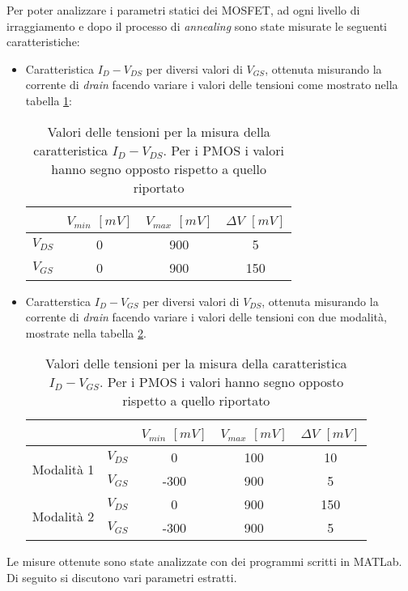 Per poter analizzare i parametri statici dei MOSFET, ad ogni livello di irraggiamento e dopo il processo di \emph{annealing} sono state misurate le seguenti caratteristiche:

\begin{itemize}

\item{Caratteristica $I_D-V_{DS}$} per diversi valori di $V_{GS}$, ottenuta misurando la corrente di \emph{drain} facendo variare i valori delle tensioni come mostrato nella tabella \ref{tab:tensioniIdVds}:

\begin{table}[ht]
  \renewcommand{\arraystretch}{1.3}
  \centering
    \begin{tabular}{c c c c}
      \toprule
         & $V_{min}$ $[mV]$ & $V_{max}$ $[mV]$ & $\Delta V$ $[mV]$ \\
     \midrule
	  $V_{DS}$ & 0 & 900 & 5 \\
	\hline
	   $V_{GS}$ & 0 & 900 & 150\\
      \bottomrule
    \end{tabular}
  \caption[Valori delle tensioni per la misura della caratteristica $I_D-V_{DS}$]{Valori delle tensioni per la misura della caratteristica $I_D-V_{DS}$. Per i PMOS i valori hanno segno opposto rispetto a quello riportato}
  \label{tab:tensioniIdVds}
\end{table}

\item{Caratterstica $I_D-V_{GS}$} per diversi valori di $V_{DS}$, ottenuta misurando la corrente di \emph{drain} facendo variare i valori delle tensioni con due modalità, mostrate nella tabella \ref{tab:tensioniIdVgs}. 

\begin{table}[ht]
  \renewcommand{\arraystretch}{1.3}
  \centering
    \begin{tabular}{c c c c c}
      \toprule
        & & $V_{min}$ $[mV]$ & $V_{max}$ $[mV]$ & $\Delta V$ $[mV]$ \\
     \midrule
	  \multirow{2}{*}{Modalità 1} & $V_{DS}$ & 0 & 100 & 10 \\
	\cmidrule{2-5}
	  & $V_{GS}$ & -300 & 900 & 5\\
	\midrule
	  \multirow{2}{*}{Modalità 2} & $V_{DS}$ & 0 & 900 & 150 \\
	\cmidrule{2-5}
	  & $V_{GS}$ & -300 & 900 & 5\\
      \bottomrule
    \end{tabular}
  \caption[Valori delle tensioni per la misura della caratteristica $I_D-V_{GS}$]{Valori delle tensioni per la misura della caratteristica $I_D-V_{GS}$. Per i PMOS i valori hanno segno opposto rispetto a quello riportato}
  \label{tab:tensioniIdVgs}
\end{table}

\end{itemize}


Le misure ottenute sono state analizzate con dei programmi scritti in MATLab. Di seguito si discutono vari parametri estratti.
